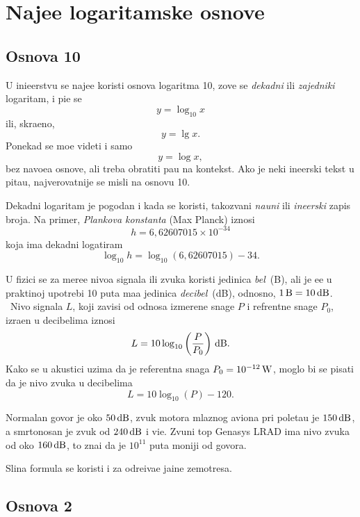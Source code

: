 \documentclass[12pt, twoside, a4paper]{article}
\def\logten{\log_{10}}
\def\puta{\times}
\def\.{{,}}
\def\um#1{\,{\rm#1}}
\begin{document}
\section{Naj{\cv}e{\sv}{\cc}e logaritamske osnove}

\subsection{Osnova 10}

U ini{\zv}e{\nj}erstvu se naj{\cv}e{\sv}{\cc}e koristi osnova logaritma 10,
zove se {\sl dekadni\/} ili {\sl zajedni{\cv}ki\/} logaritam, i pi{\sv}e se
$$
y=\logten x
$$
ili, skra{\cc}eno,
$$
y=\lg x.
$$
Ponekad se mo{\zv}e videti i samo
$$
y=\log x,
$$
bez navo{\dj}e{\nj}a osnove, ali treba obratiti pa{\zv}{\nj}u na kontekst.
Ako je neki in{\zv}e{\nj}erski tekst u pita{\nj}u, najverovatnije se misli na osnovu 10.

Dekadni logaritam je pogodan i kada se koristi, takozvani {\sl nau{\cv}ni\/} ili {\sl in{\zv}e{\nj}erski\/}
zapis broja.
Na primer, {\sl Plankova konstanta\/} (Max Planck) iznosi
$$
h=6\.62607015\puta 10^{-34}
$$
koja ima dekadni logatiram
$$
\logten h=\logten(6\.62607015) - 34.
$$

U fizici se za mere{\nj}e nivoa signala ili zvuka koristi jedinica {\sl be\/l}~(B), ali je {\cv}e{\sv}{\cc}e
u prakti{\cv}noj upotrebi 10 puta ma{\nj}a jedinica {\sl decibel\/}~(dB), odnosno, $1\um{B}=10\um{dB}$. \
Nivo \hbox{sig\-na\-la} $L$, koji zavisi
od odnosa izmerene snage $P$ i refrentne snage $P_0$, izra{\zv}en u deci\-belima iznosi
$$
L=10\logten\left({P\over P_0}\right)\um{dB}.
$$
Kako se u akustici uzima da je referentna snaga $P_0=10^{-12}\um W$, moglo bi se pisati
da je nivo zvuka u decibelima
$$
L=10\logten(P)-120.
$$

Normalan govor je oko $50\um{dB}$, 
zvuk motora mlaznog aviona pri poleta{\nj}u je $150\um{dB}$, 
a smrtonosan je zvuk od $240\um{dB}$ i vi{\sv}e.
Zvu{\cv}ni top {\sf Genasys LRAD} ima nivo zvuka od oko $160\um{dB}$,
{\sv}to zna{\cv}i da je $10^{11}$ puta mo{\cc}niji od govora.

Sli{\cv}na formula se koristi i za odre{\dj}iva{\nj}e ja{\cv}ine zem{\lj}otresa.

\subsection{Osnova 2}

\def\lb{\mathop{\rm lb}}
\def\bits{{\it bits}}
\def\mant{{\it mantisa}}%
\def\expo{{\it eksponent}}%
\def\znak{{\it znak}}%
\end{document}
